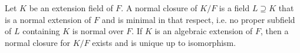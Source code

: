 \documentclass[12pt]{article}
\begin{document}
Let $K$ be an extension field of $F$. A normal closure of $K/F$ is a field $L \supseteq K$ that is a normal extension of $F$ and is minimal in that respect, i.e. no proper subfield of $L$ containing $K$ is normal over $F$. If $K$ is an algebraic extension of $F$, then a normal closure for $K/F$ exists and is unique up to isomorphism.
\end{document}
